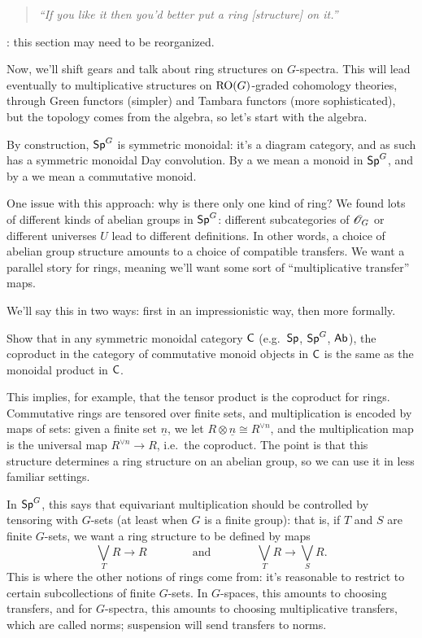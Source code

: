 \begin{quote}\textit{
	``If you like it then you'd better put a ring [structure] on it.''
}\end{quote}
\TODO: this section may need to be reorganized.

Now, we'll shift gears and talk about ring structures on $G$-spectra. This will lead eventually to multiplicative
structures on $\mathrm{RO}(G)$-graded cohomology theories, through Green functors (simpler) and Tambara functors (more
sophisticated), but the topology comes from the algebra, so let's start with the algebra.

By construction, $\mathsf{Sp}^G$ is symmetric monoidal: it's a diagram category, and as such has a symmetric monoidal Day
convolution. By a  we mean a monoid in $\mathsf{Sp}^G$, and by a  we
mean a commutative monoid.

One issue with this approach: why is there only one kind of ring? We found lots of different kinds of abelian
groups in $\mathsf{Sp}^G$: different subcategories of $\mathscr O_G$ or different universes $U$ lead to different definitions. In
other words, a choice of abelian group structure amounts to a choice of compatible transfers. We want a parallel
story for rings, meaning we'll want some sort of ``multiplicative transfer'' maps.

We'll say this in two ways: first in an impressionistic way, then more formally.

\begin{ex}
Show that in any symmetric monoidal category $\mathsf C$ (e.g.\ $\mathsf{Sp}$, $\mathsf{Sp}^G$, $\mathsf{Ab}$), the coproduct in the category
of commutative monoid objects in $\mathsf C$ is the same as the monoidal product in $\mathsf C$.
\end{ex}
This implies, for example, that the tensor product is the coproduct for rings.
Commutative rings are tensored over finite sets, and multiplication is encoded by maps of sets: given a finite set
$\underline n$, we let $R\otimes\underline n\cong R^{\lor n}$, and the multiplication map is the universal map
$R^{\vee n}\to R$, i.e.\ the coproduct. The point is that this structure determines a ring structure on an abelian
group, so we can use it in less familiar settings.

In $\mathsf{Sp}^G$, this says that equivariant multiplication should be controlled by tensoring with $G$-sets (at least
when $G$ is a finite group): that is, if $T$ and $S$ are finite $G$-sets, we want a ring structure to be defined by
maps
\[\bigvee_T R\longrightarrow R\qquad\qquad\text{and}\qquad\qquad\bigvee_T
R\longrightarrow\bigvee_S R.\]
This is where the other notions of rings come from: it's reasonable to restrict to certain subcollections of finite
$G$-sets. In $G$-spaces, this amounts to choosing transfers, and for $G$-spectra, this amounts to choosing
multiplicative transfers, which are called norms; suspension will send transfers to norms.

